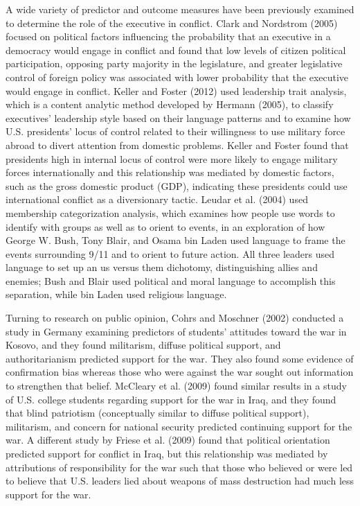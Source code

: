 \documentclass[english,man]{apa6}
\theoremstyle{definition}
\theoremstyle{definition}
\theoremstyle{definition}
\theoremstyle{remark}
\begin{document}
A wide variety of predictor and outcome measures have been previously
examined to determine the role of the executive in conflict. Clark and
Nordstrom (2005) focused on political factors influencing the
probability that an executive in a democracy would engage in conflict
and found that low levels of citizen political participation, opposing
party majority in the legislature, and greater legislative control of
foreign policy was associated with lower probability that the executive
would engage in conflict. Keller and Foster (2012) used leadership trait
analysis, which is a content analytic method developed by Hermann
(2005), to classify executives' leadership style based on their language
patterns and to examine how U.S. presidents' locus of control related to
their willingness to use military force abroad to divert attention from
domestic problems. Keller and Foster found that presidents high in
internal locus of control were more likely to engage military forces
internationally and this relationship was mediated by domestic factors,
such as the gross domestic product (GDP), indicating these presidents
could use international conflict as a diversionary tactic. Leudar et al.
(2004) used membership categorization analysis, which examines how
people use words to identify with groups as well as to orient to events,
in an exploration of how George W. Bush, Tony Blair, and Osama bin Laden
used language to frame the events surrounding 9/11 and to orient to
future action. All three leaders used language to set up an us versus
them dichotomy, distinguishing allies and enemies; Bush and Blair used
political and moral language to accomplish this separation, while bin
Laden used religious language.

Turning to research on public opinion, Cohrs and Moschner (2002)
conducted a study in Germany examining predictors of students' attitudes
toward the war in Kosovo, and they found militarism, diffuse political
support, and authoritarianism predicted support for the war. They also
found some evidence of confirmation bias whereas those who were against
the war sought out information to strengthen that belief. McCleary et
al. (2009) found similar results in a study of U.S. college students
regarding support for the war in Iraq, and they found that blind
patriotism (conceptually similar to diffuse political support),
militarism, and concern for national security predicted continuing
support for the war. A different study by Friese et al. (2009) found
that political orientation predicted support for conflict in Iraq, but
this relationship was mediated by attributions of responsibility for the
war such that those who believed or were led to believe that U.S.
leaders lied about weapons of mass destruction had much less support for
the war.
\end{document}
